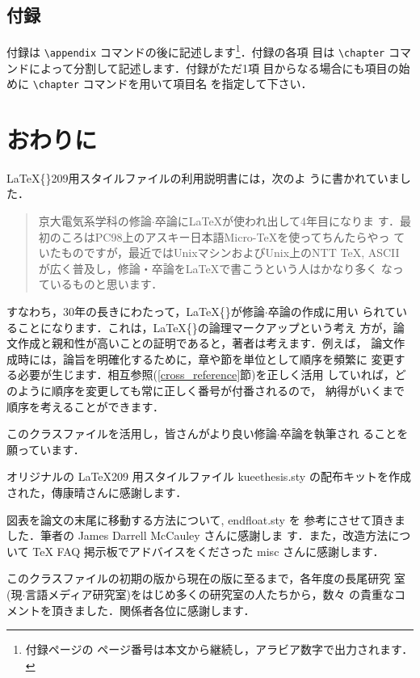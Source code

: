\documentclass[
  sotsuron]{kuee}
\begin{document}
\hypertarget{ux4ed8ux9332}{%
\section{付録}\label{ux4ed8ux9332}}

付録は \verb+\appendix+ コマンドの後に記述します\footnote{付録ページの
  ページ番号は本文から継続し，アラビア数字で出力されます．}．付録の各項
目は \verb+\chapter+ コマンドによって分割して記述します．付録がただ1項
目からなる場合にも項目の始めに \verb+\chapter+ コマンドを用いて項目名
を指定して下さい．

\hypertarget{ux304aux308fux308aux306b}{%
\chapter{おわりに}\label{ux304aux308fux308aux306b}}

\label{chap:conclusion}

\LaTeX\{\}209用スタイルファイルの利用説明書\cite{OldTebiki}には，次のよ
うに書かれていました．

\begin{quote}
  京大電気系学科の修論$\cdot$卒論に\LaTeX が使われ出して4年目になりま
  す．最初のころはPC98上のアスキー日本語Micro-\TeX を使ってちんたらやっ
  ていたものですが，最近ではUnixマシンおよびUnix上のNTT \TeX, ASCII
  \JTeX が広く普及し，修論・卒論を\LaTeX で書こうという人はかなり多く
  なっているものと思います．
\end{quote}

すなわち，30年の長きにわたって，\LaTeX\{\}が修論\(\cdot\)卒論の作成に用い
られていることになります．これは，\LaTeX\{\}の論理マークアップという考え
方が，論文作成と親和性が高いことの証明であると，著者は考えます．例えば，
論文作成時には，論旨を明確化するために，章や節を単位として順序を頻繁に
変更する必要が生じます．相互参照(\ref{cross_reference}節)を正しく活用
していれば，どのように順序を変更しても常に正しく番号が付番されるので，
納得がいくまで順序を考えることができます．

このクラスファイルを活用し，皆さんがより良い修論\(\cdot\)卒論を執筆され
ることを願っています．

\begin{acknowledgements}
  オリジナルの \LaTeX{}209 用スタイルファイル {\ttfamily
  kueethesis.sty} の配布キットを作成された，傳康晴さんに感謝します．

  図表を論文の末尾に移動する方法について, {\ttfamily endfloat.sty} を
  参考にさせて頂きました．筆者の James Darrell McCauley さんに感謝しま
  す．また，改造方法について \TeX{} FAQ 掲示板でアドバイスをくださった
  misc さんに感謝します．

  このクラスファイルの初期の版から現在の版に至るまで，各年度の長尾研究
  室(現$\cdot$言語メディア研究室)をはじめ多くの研究室の人たちから，数々
  の貴重なコメントを頂きました．関係者各位に感謝します．
\end{acknowledgements}
\end{document}

